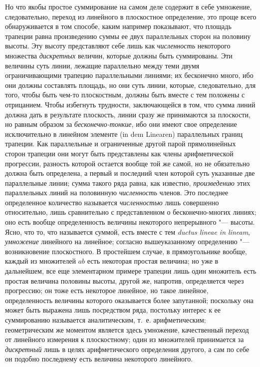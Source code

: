 Но что якобы простое суммирование на самом деле содержит в себе умножение,
следовательно, переход из линейного в плоскостное определение, это проще
всего обнаруживается в том способе, каким например показывают, что площадь
трапеции равна произведению суммы ее двух параллельных сторон на половину
высоты. Эту высоту представляют себе лишь как
{\em численность} некоторого множества
{\em дискретных} величин, которые должны быть
суммированы. Эти величины суть линии, лежащие параллельно между теми двумя
ограничивающими трапецию параллельными линиями; их бесконечно много, ибо
они должны составлять площадь, но они суть линии, которые, следовательно,
для того, чтобы быть чем-то плоскостным, должны быть вместе с тем положены
с отрицанием. Чтобы избегнуть трудности, заключающейся в том, что сумма
линий должна дать в результате плоскость, линии сразу же принимаются за
плоскости, но равным образом за
{\em бесконечно-тонкие}, ибо они имеют свое определение
исключительно в линейном элементе (in dem Linearen) параллельных границ
трапеции. Как параллельные и ограниченные другой парой прямолинейных сторон
трапеции они могут быть представлены как члены арифметической прогрессии,
разность которой остается вообще той же самой, но не обязательно должна
быть определена, а первый и последний член которой суть указанные две
параллельные линии; сумма такого ряда равна, как известно,
{\em произведению} этих параллельных линий на
половинную {\em численность} членов. Это последнее
определенное количество называется {\em численностью}
лишь совершенно относительно, лишь сравнительно с представленном о
бесконечно-многих линиях; оно есть вообще определенность величины
некоторого {непрерывного} "--- высоты. Ясно, что то,
что называется суммой, есть вместе с тем {\em ductus
lineae in lineam}, {\em умножение} линейного на линейное;
согласно вышеуказанному определению "--- возникновение плоскостного.
В простейшем случае, в прямоугольнике вообще, каждый из множителей
$ab$ есть некоторая простая величина; но уже в
дальнейшем, все еще элементарном примере трапеции лишь один множитель есть
простая величина половины высоты, другой же, напротив, определяется через
прогрессию; он тоже есть некоторое линейное, но такое линейное,
определенность величины которого оказывается более запутанной; поскольку
она может быть выражена лишь посредством ряда, постольку интерес к ее
суммированию называется аналитическим, т.~е. арифметическим; геометрическим
же моментом является здесь умножение, качественный переход от линейного
измерения к плоскостному; один из множителей принимается за
{\em дискретный} лишь в целях арифметического
определения другого, а сам по себе он подобно последнему есть величина
некоторого линейного.

